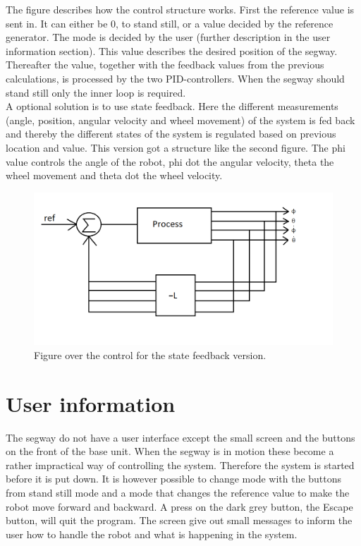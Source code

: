 \documentclass[a4paper]{article}
\begin{document}
The figure describes how the control structure works. First the reference value is sent in. It can either be 0, to stand still, or a value decided by the reference generator. The mode is decided by the user (further description in the user information section). This value describes the desired position of the segway. Thereafter the value, together with the feedback values from the previous calculations, is processed by the two PID-controllers. When the segway should stand still only the inner loop is required. \\

A optional solution is to use state feedback. Here the different measurements (angle, position, angular velocity and wheel movement) of the system is fed back and thereby the different states of the system is regulated based on previous location and value. This version got a structure like the second figure. The phi value controls the angle of the robot, phi dot the angular velocity, theta the wheel movement and theta dot the wheel velocity. \\

\begin{figure}[H]
  \centering
\includegraphics[scale=0.5]{pic/Statefeedback.png}
\caption{Figure over the control for the state feedback version.}
\end{figure}

\section{User information}

The segway do not have a user interface except the small screen and the buttons on the front of the base unit. When the segway is in motion these become a rather impractical way of controlling the system. Therefore the system is started before it is put down. It is however possible to change mode with the buttons from stand still mode and a mode that changes the reference value to make the robot move forward and backward. A press on the dark grey button, the Escape button, will quit the program. The screen give out small messages to inform the user how to handle the robot and what is happening in the system.\\
\end{document}
